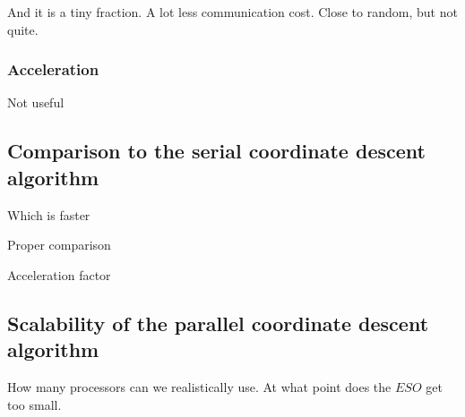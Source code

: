 And it is a tiny fraction. A lot less communication cost. Close to random, but not quite.


\subsubsection{Acceleration}
Not useful


\subsection{Comparison to the serial coordinate descent algorithm}
Which is faster

Proper comparison

Acceleration factor


\subsection{Scalability of the parallel coordinate descent algorithm}
How many processors can we realistically use. At what point does the $ESO$ get too small.





